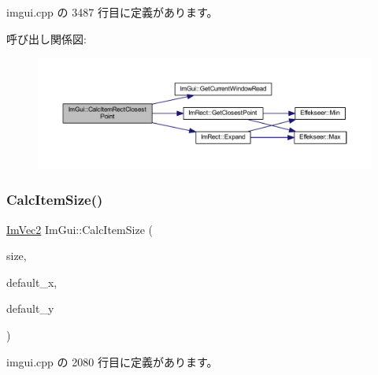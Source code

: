  imgui.\+cpp の 3487 行目に定義があります。

呼び出し関係図\+:\nopagebreak
\begin{figure}[H]
\begin{center}
\leavevmode
\includegraphics[width=350pt]{namespace_im_gui_a6c66a7acf7e6eef639b5f1211d8332a3_cgraph}
\end{center}
\end{figure}
\mbox{\label{namespace_im_gui_a3c1505e785f9571ed82500692a727c5f}} 
\subsubsection{\texorpdfstring{Calc\+Item\+Size()}{CalcItemSize()}}
{\footnotesize\ttfamily \mbox{\hyperlink{struct_im_vec2}{Im\+Vec2}} Im\+Gui\+::\+Calc\+Item\+Size (\begin{DoxyParamCaption}\item[{\mbox{\hyperlink{struct_im_vec2}{Im\+Vec2}}}]{size,  }\item[{float}]{default\+\_\+x,  }\item[{float}]{default\+\_\+y }\end{DoxyParamCaption})}



 imgui.\+cpp の 2080 行目に定義があります。

